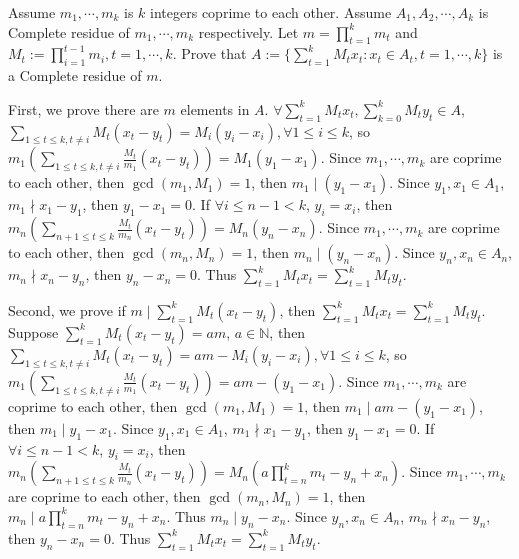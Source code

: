 \documentclass{ctexart}
\begin{document}
\begin{problem}\label{pro:p40.4}
  Assume \(m_1,\cdots,m_k\) is \(k\) integers coprime to each other.
  Assume \(A_1,A_2,\cdots,A_k\) is Complete residue of \(m_1,\cdots,m_k\) respectively.
  Let \(m=\prod_{t=1}^{k}m_t\) and \(M_t:=\prod_{i=1}^{t-1}m_i,t=1,\cdots,k\).
  Prove that \(A:=\{\sum_{t=1}^{k}M_t x_t:x_t \in A_t,t=1,\cdots,k\}\) is a Complete residue of \(m\).
\end{problem}
\begin{solution}
  First, we prove there are \(m\) elements in \(A\). \(\forall \sum_{t=1}^{k}M_tx_t, \sum_{k=0}^{k}M_ty_t \in A\),
  \(\sum_{1 \leq t \leq k, t \neq i} M_t(x_t-y_t)=M_i(y_i-x_i), \forall 1 \leq i \leq k\),
  so \(m_1 (\sum_{1 \leq t \leq k, t \neq i}\frac{M_t}{m_1}(x_t - y_t)) = M_1(y_1 - x_1)\).
  Since \(m_1,\cdots,m_k\) are coprime to each other,
  then \(\gcd(m_1,M_1)=1\),
  then \(m_1 \mid (y_1-x_1)\).
  Since \(y_1,x_1 \in A_1\), \(m_1 \nmid x_1-y_1\), then \(y_1-x_1=0\).
  If \(\forall i \leq n-1<k\), \(y_i=x_i\),
  then \(m_{n} (\sum_{n + 1\leq t \leq k}\frac{M_t}{m_{n}}(x_t - y_t)) = M_{n}(y_{n} - x_{n})\).
  Since \(m_1,\cdots,m_k\) are coprime to each other,
  then \(\gcd(m_n,M_n)=1\),
  then \(m_n \mid (y_n-x_n)\).
  Since \(y_n,x_n \in A_n\), \(m_n \nmid x_n-y_n\), then \(y_n-x_n=0\).
  Thus \(\sum_{t=1}^{k} M_tx_t=\sum_{t=1}^{k}M_ty_t\).

  Second, we prove if \(m \mid \sum_{t=1}^{k}M_t(x_t-y_t)\), then \(\sum_{t=1}^{k}M_tx_t=\sum_{t=1}^{k}M_ty_t\).
  Suppose \(\sum_{t=1}^{k} M_t(x_t -y_t)=am\), \(a \in \mathbb{N}\), then
  \(\sum_{1 \leq t \leq k, t \neq i} M_t(x_t-y_t)=am-M_i(y_i-x_i), \forall 1 \leq i \leq k\),
  so \(m_1 (\sum_{1 \leq t \leq k, t \neq i}\frac{M_t}{m_1}(x_t - y_t)) = am-(y_1 - x_1)\).
  Since \(m_1,\cdots,m_k\) are coprime to each other,
  then \(\gcd(m_1,M_1)=1\),
  then \(m_1 \mid am- (y_1-x_1)\),
  then \(m_1 \mid y_1-x_1\).
  Since \(y_1,x_1 \in A_1\), \(m_1 \nmid x_1-y_1\), then \(y_1-x_1=0\).
  If \(\forall i \leq n-1<k\), \(y_i=x_i\),
  then \(m_{n} (\sum_{n + 1\leq t \leq k}\frac{M_t}{m_{n}}(x_t - y_t)) = M_{n}(a \prod_{t=n}^km_t-y_{n} + x_{n})\).
  Since \(m_1,\cdots,m_k\) are coprime to each other,
  then \(\gcd(m_n,M_n)=1\),
  then \(m_n \mid a \prod_{t=n}^{k}m_t- y_n + x_n\).
  Thus \(m_n \mid y_n-x_n\).
  Since \(y_n,x_n \in A_n\), \(m_n \nmid x_n-y_n\), then \(y_n-x_n=0\).
  Thus \(\sum_{t=1}^{k} M_tx_t=\sum_{t=1}^{k}M_ty_t\).
\end{solution}
\end{document}
